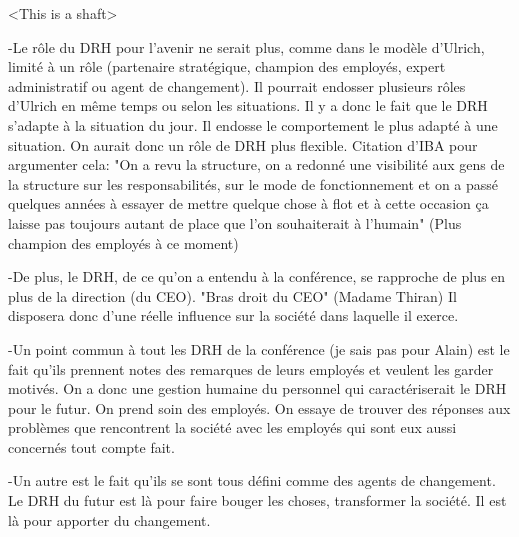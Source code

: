	<This is a shaft>
	
	-Le rôle du DRH pour l'avenir ne serait plus, comme dans le modèle d'Ulrich, limité à un rôle (partenaire stratégique, champion des employés, expert administratif ou agent de changement). Il pourrait endosser plusieurs rôles d'Ulrich en même temps ou selon les situations. Il y a donc le fait que le DRH s'adapte à la situation du jour. Il endosse le comportement le plus adapté à une situation. On aurait donc un rôle de DRH plus flexible. 
	Citation d'IBA pour argumenter cela:
	"On a revu la  structure, on a redonné une 
visibilité aux gens de la structure sur les responsabilités, sur le mode de fonctionnement et on a passé 
quelques années à essayer de mettre quelque chose à flot et à cette occasion ça laisse  pas toujours 
autant de place que l'on souhaiterait à l'humain"
(Plus champion des employés à ce moment)

	-De plus, le DRH, de ce qu'on a entendu à la conférence, se rapproche de plus en plus de la direction (du CEO). 
	"Bras droit du CEO" (Madame Thiran)
	Il disposera donc d'une réelle influence sur la société dans laquelle il exerce.  
	
	-Un point commun à tout les DRH de la conférence (je sais pas pour Alain) est le fait qu'ils prennent notes des remarques de leurs employés et veulent les garder motivés. On a donc une gestion humaine du personnel qui caractériserait le DRH pour le futur. On prend soin des employés. On essaye de trouver des réponses aux problèmes que rencontrent la société avec les employés qui sont eux aussi concernés tout compte fait. 
	
	-Un autre est le fait qu'ils se sont tous défini comme des agents de changement. Le DRH du futur est là pour faire bouger les choses, transformer la société.  Il est là pour apporter du changement. 
	